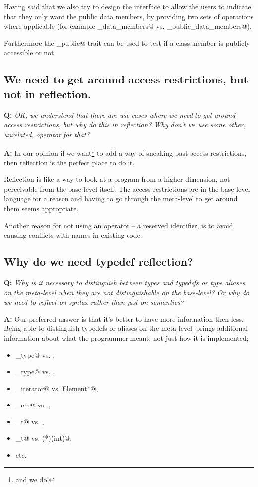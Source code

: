 Having said that we also try to design the interface to allow the users
to indicate that they only want the public data members, by providing
two sets of operations where applicable (for example \verb@get_data_members@
vs. \verb@get_public_data_members@).

Furthermore the \verb@is_public@ trait can be used to test if a class member
is publicly accessible or not.

\subsection{We need to get around access restrictions, but not in reflection.}

\textbf{Q:} {\em OK, we understand that there are use cases where we need
to get around access restrictions, but why do this in reflection?
Why don't we use some other, unrelated,  operator for that?}

\textbf{A:}
In our opinion if we want\footnote{and we do!} to add a way of sneaking past
access restrictions, then reflection is the perfect place to do it.

Reflection is like a way to look at a program from a higher dimension,
not perceivable from the base-level itself. The access restrictions are in
the base-level language for a reason and having to go through the meta-level
to get around them seems appropriate.

Another reason for not using an operator -- a reserved identifier, is to avoid
causing conflicts with names in existing code.

\subsection{Why do we need typedef reflection?}

\textbf{Q:} {\em Why is it necessary to distinguish between types and typedefs
or type aliases on the meta-level when they are not distinguishable on the
base-level? Or why do we need to reflect on syntax rather than just on semantics?}

\textbf{A:} Our preferred answer is that it's better to have more information
then less. Being able to distinguish typedefs or aliases on the meta-level,
brings additional information about what the programmer meant, not just how
it is implemented;
\begin{itemize}
	\item \verb@size_type@ vs. \verb@unsigned@,
	\item \verb@rank_type@ vs. \verb@short@,
	\item \verb@const_iterator@ vs. \verb@const Element*@,
	\item \verb@height_cm@ vs. \verb@float@,
	\item \verb@pid_t@ vs. \verb@int@,
	\item \verb@sighandler_t@ vs. \verb@void (*)(int)@,
	\item etc.
\end{itemize}

